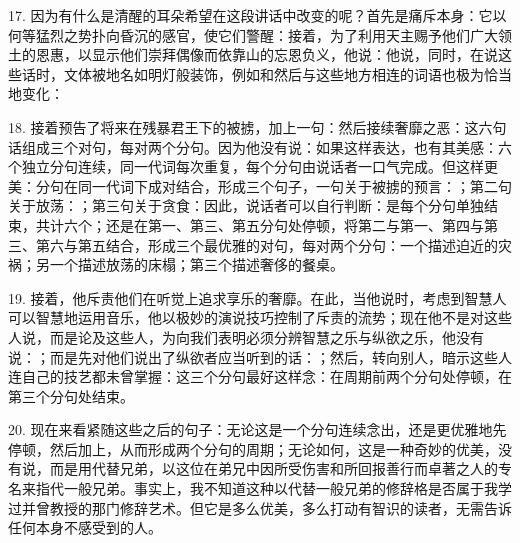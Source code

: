 17. 因为有什么是清醒的耳朵希望在这段讲话中改变的呢？首先是痛斥本身：它以何等猛烈之势扑向昏沉的感官，使它们警醒：接着，为了利用天主赐予他们广大领土的恩惠，以显示他们崇拜偶像而依靠山的忘恩负义，他说：他说，同时，在说这些话时，文体被地名如明灯般装饰，例如和然后与这些地方相连的词语也极为恰当地变化：\par

18. 接着预告了将来在残暴君王下的被掳，加上一句：然后接续奢靡之恶：这六句话组成三个对句，每对两个分句。因为他没有说：如果这样表达，也有其美感：六个独立分句连续，同一代词每次重复，每个分句由说话者一口气完成。但这样更美：分句在同一代词下成对结合，形成三个句子，一句关于被掳的预言：；第二句关于放荡：；第三句关于贪食：因此，说话者可以自行判断：是每个分句单独结束，共计六个；还是在第一、第三、第五分句处停顿，将第二与第一、第四与第三、第六与第五结合，形成三个最优雅的对句，每对两个分句：一个描述迫近的灾祸；另一个描述放荡的床榻；第三个描述奢侈的餐桌。\par

19. 接着，他斥责他们在听觉上追求享乐的奢靡。在此，当他说时，考虑到智慧人可以智慧地运用音乐，他以极妙的演说技巧控制了斥责的流势；现在他不是对这些人说，而是论及这些人，为向我们表明必须分辨智慧之乐与纵欲之乐，他没有说：；而是先对他们说出了纵欲者应当听到的话：；然后，转向别人，暗示这些人连自己的技艺都未曾掌握：这三个分句最好这样念：在周期前两个分句处停顿，在第三个分句处结束。\par

20. 现在来看紧随这些之后的句子：无论这是一个分句连续念出，还是更优雅地先停顿，然后加上，从而形成两个分句的周期；无论如何，这是一种奇妙的优美，没有说，而是用代替兄弟，以这位在弟兄中因所受伤害和所回报善行而卓著之人的专名来指代一般兄弟。事实上，我不知道这种以代替一般兄弟的修辞格是否属于我学过并曾教授的那门修辞艺术。但它是多么优美，多么打动有智识的读者，无需告诉任何本身不感受到的人。\par

